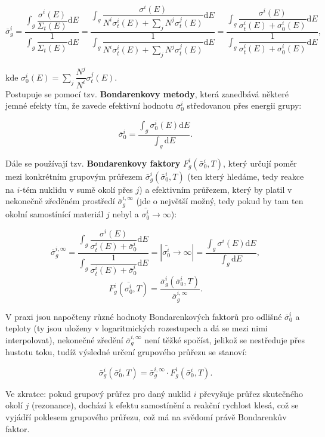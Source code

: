 $$ \bar{\sigma}_g^i = \dfrac{\int_g \dfrac{\sigma^i(E)}{\Sigma_t(E)} \text{d}E}{\int_g \dfrac{1}{\Sigma_t(E)} \text{d}E} = \dfrac{\int_g \dfrac{\sigma^i(E)}{N^i \sigma_t^i(E) + \sum_j N^j \sigma_t^j(E)} \text{d}E}{\int_g \dfrac{1}{N^i \sigma_t^i(E) + \sum_j N^j \sigma_t^j(E)} \text{d}E} = \dfrac{\int_g \dfrac{\sigma^i(E)}{\sigma_t^i(E) + \sigma_0^i(E)} \text{d}E}{\int_g \dfrac{1}{\sigma_t^i(E) + \sigma_0^i(E)} \text{d}E},$$

\noindent kde $\sigma_0^i(E) = \sum_j \dfrac{N^j}{N^i} \sigma_t^j(E).$\\

Postupuje se pomocí tzv. \textbf{Bondarenkovy metody}, která zanedbává některé jemné efekty tím, že zavede efektivní hodnotu $\bar{\sigma}_0^i$ středovanou přes energii grupy:

$$ \bar{\sigma}_0^i = \dfrac{\int_g \sigma^i_0(E) \text{d}E}{\int_g \text{d}E}.$$

Dále se používají tzv. \textbf{Bondarenkovy faktory} $F_g^i(\bar{\sigma}_0^i, T)$, který určují poměr mezi konkrétním grupovým průřezem $\bar{\sigma}_g^i(\bar{\sigma}_0^i, T)$ (ten který hledáme, tedy reakce na $i$-tém nuklidu v sumě okolí přes $j$) a efektivním průřezem, který by platil v nekonečně zředěném prostředí $\bar{\sigma}_g^{i,\infty}$ (jde o největší možný, tedy pokud by tam ten okolní samostínící materiál $j$ nebyl a $\bar{\sigma_0^i} \rightarrow \infty$):

$$ \bar{\sigma}_g^{i,\infty} = \dfrac{\int_g \dfrac{\sigma^i(E)}{\sigma_t^i(E) + \bar{\sigma}_0^i} \text{d}E}{\int_g \dfrac{1}{\sigma_t^i(E) + \bar{\sigma}_0^i} \text{d}E} = |\bar{\sigma_0^i} \rightarrow \infty| = \dfrac{\int_g \sigma^i(E) \text{d}E}{\int_g \text{d}E},$$
$$ F_g^i (\bar{\sigma_0^i}, T) = \dfrac{\bar{\sigma}_g^i(\bar{\sigma}_0^i, T)}{\bar{\sigma}_g^{i,\infty}}. $$

V praxi jsou napočteny různé hodnoty Bondarenkových faktorů pro odlišné $\bar{\sigma}_0^i$ a teploty (ty jsou uloženy v logaritmických rozestupech a dá se mezi nimi interpolovat), nekonečné zředění $\bar{\sigma}_g^{i,\infty}$ není těžké spočíst, jelikož se nestředuje přes hustotu toku, tudíž výsledné určení grupového průřezu se stanoví:

\begin{equation}
  \boxed{
    \bar{\sigma}_g^i(\bar{\sigma}_0^i, T) = \bar{\sigma}_g^{i,\infty} \cdot F_g^i (\bar{\sigma}_0^i, T).}
\end{equation}

Ve zkratce: pokud grupový průřez pro daný nuklid  $i$ převyšuje průřez skutečného okolí $j$ (rezonance), dochází k efektu samostínění a reakční rychlost klesá, což se vyjádří poklesem grupového průřezu, což má na svědomí právě Bondarenkův faktor.\\

